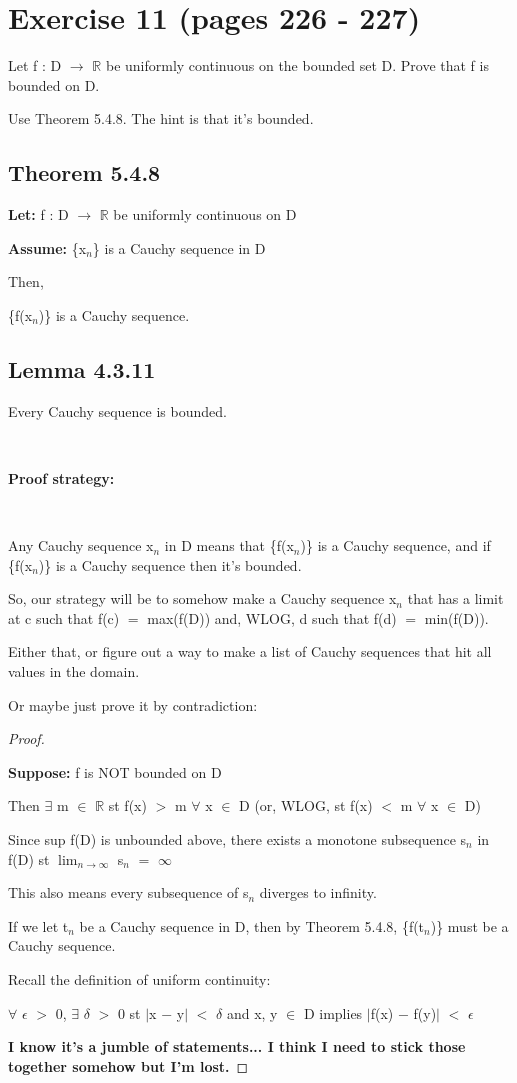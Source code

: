 \documentclass{article}
\newcommand{\mt}[1]{\ensuremath{#1}}
\newcommand\bsc[2][\DefaultOpt]{%
  \def\DefaultOpt{#2}%
  \section[#1]{#2}%
}
\newcommand\ssc[2][\DefaultOpt]{%
  \def\DefaultOpt{#2}%
  \subsection[#1]{#2}%
}
\newcommand{\bgpf}{\begin{proof} $ $\newline}
\newcommand{\lt}[1]{\textbf{Let: } #1}
\newcommand{\supp}[1]{\textbf{Suppose: } #1}
\newcommand{\as}[1]{\textbf{Assume: } #1}
\newcommand{\epf}{\end{proof}}
\newcommand{\br}{\mt{\mathbb{R}} }       %
\newcommand{\ep}{\mt{\epsilon} }         %
\newcommand{\fa}{\mt{\forall} }          %
\newcommand{\dta}{\mt{\delta} }
\newcommand{\mem}{\mt{\in} }
\newcommand{\exs}{\mt{\exists} }
\newcommand{\lra}{ \mt{\longrightarrow} } %
\newcommand{\av}[1]{\mt{|}#1\mt{|}}  %
\newcommand{\bk}[1]{\{#1\}}
\newcommand{\ms}{\mt{-} }
\newcommand{\ls}{\mt{<} }
\newcommand{\gr}{\mt{>} }
\newcommand{\eql}{\mt{=} }
\newcommand{\uw}[2]{#1\mt{_{#2}}}
\newcommand{\lmti}[1]{\mt{\displaystyle{\lim_{#1 \to \infty}}}}
\newcommand{\infy}{\mt{\infty} }
\begin{document}
\newpage

\bsc{Exercise 11 (pages 226 - 227)}{

Let f : D \lra \br be uniformly continuous on the bounded set D. Prove that f is bounded on D. 

Use Theorem 5.4.8. The hint is that it's bounded.

\ssc{Theorem 5.4.8}{

\lt{f : D \lra \br be uniformly continuous on D}

\as{\bk{\uw{x}{n}} is a Cauchy sequence in D}

Then,

\bk{f(\uw{x}{n})} is a Cauchy sequence.
}

\ssc{Lemma 4.3.11}{
Every Cauchy sequence is bounded.
}

\

\textbf{Proof strategy:}

\

Any Cauchy sequence \uw{x}{n} in D means that \bk{f(\uw{x}{n})} is a Cauchy sequence, and if \bk{f(\uw{x}{n})} is a Cauchy sequence then it's bounded.

So, our strategy will be to somehow make a Cauchy sequence \uw{x}{n} that has a limit at c such that f(c) \eql max(f(D)) and, WLOG, d such that f(d) \eql min(f(D)).

Either that, or figure out a way to make a list of Cauchy sequences that hit all values in the domain.

Or maybe just prove it by contradiction:

\bgpf

\supp{f is NOT bounded on D}

Then \exs m \mem \br st f(x) \gr m \fa x \mem D (or, WLOG, st f(x) \ls m \fa x \mem D)

Since sup f(D) is unbounded above, there exists a monotone subsequence \uw{s}{n} in f(D) st \lmti{n} \uw{s}{n} \eql \infy

This also means every subsequence of \uw{s}{n} diverges to infinity.

If we let \uw{t}{n} be a Cauchy sequence in D, then by Theorem 5.4.8, \bk{f(\uw{t}{n})} must be a Cauchy sequence.

Recall the definition of uniform continuity:

\fa \ep \gr 0, \exs \dta \gr 0 st \av{x \ms y} \ls \dta and x, y \mem D implies \av{f(x) \ms f(y)} \ls \ep

\textbf{I know it's a jumble of statements... I think I need to stick those together somehow but I'm lost.}



\epf
}
\end{document}
